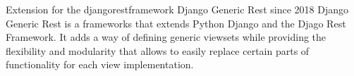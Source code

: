 

\begin{cventries}


\cventry
{Extension for the djangorestframework} %
{Django Generic Rest} %
{} %
{since 2018} %
{Django Generic Rest is a frameworks that extends Python Django and the Djago Rest Framework. It adds a way of defining generic viewsets while providing the flexibility and modularity that allows to easily replace certain parts of functionality for each view implementation.} %

\end{cventries}
